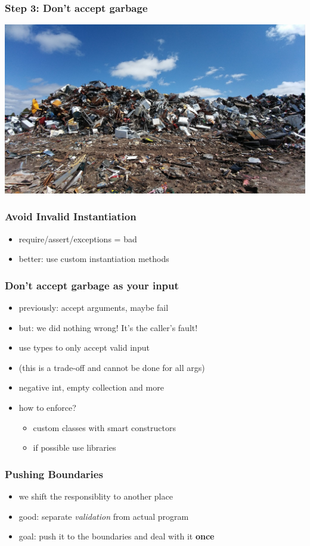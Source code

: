 \documentclass{beamer}
\begin{document}
\begin{frame}
  \frametitle{Step 3: Don't accept garbage}
  \includegraphics[width=\textwidth]{../pics/scrapyard-2441432_1280.jpg}
\end{frame}

\begin{frame}
  \frametitle{Avoid Invalid Instantiation}
  \begin{itemize}
  \item require/assert/exceptions = bad
  \item better: use custom instantiation methods
  \end{itemize}
\end{frame}

\begin{frame}
  \frametitle{Don't accept garbage as your input}
   \begin{itemize}
  \item previously: accept arguments, maybe fail
  \item but: we did nothing wrong!  It's the caller's fault!
  \item use types to only accept valid input
  \item (this is a trade-off and cannot be done for all args)
  \item negative int, empty collection and more
  \item how to enforce?
    \begin{itemize}
    \item custom classes with smart constructors
    \item if possible use libraries
    \end{itemize}
  \end{itemize}
\end{frame}

\begin{frame}
  \frametitle{Pushing Boundaries}
  \begin{itemize}
  \item we shift the responsiblity to another place
  \item good: separate \textit{validation} from actual program
  \item goal: push it to the boundaries and deal with it \textbf{once}
  \end{itemize}
\end{frame}
\end{document}
